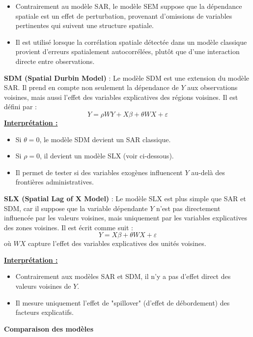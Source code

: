 \documentclass[
]{article}
\begin{document}
\begin{itemize}
\item Contrairement au modèle SAR, le modèle SEM suppose que la dépendance spatiale est un effet de perturbation, provenant d’omissions de variables pertinentes qui suivent une structure spatiale.
\item Il est utilisé lorsque la corrélation spatiale détectée dans un modèle classique provient d’erreurs spatialement autocorrélées, plutôt que d’une interaction directe entre observations.
\end{itemize}

\textbf{SDM (Spatial Durbin Model)} : Le modèle SDM est une extension du
modèle SAR. Il prend en compte non seulement la dépendance de \(Y\) aux
observations voisines, mais aussi l'effet des variables explicatives des
régions voisines. Il est défini par : \[
Y = \rho W Y + X \beta + \theta W X + \varepsilon
\] \underline{\textbf{Interprétation :}}

\begin{itemize}
\item Si \( \theta = 0 \), le modèle SDM devient un SAR classique.
\item Si \( \rho = 0 \), il devient un modèle SLX (voir ci-dessous).
\item Il permet de tester si des variables exogènes influencent \( Y \) au-delà des frontières administratives.
\end{itemize}

\textbf{SLX (Spatial Lag of X Model)} : Le modèle SLX est plus simple
que SAR et SDM, car il suppose que la variable dépendante \(Y\) n'est
pas directement influencée par les valeurs voisines, mais uniquement par
les variables explicatives des zones voisines. Il est écrit comme suit :
\[
Y = X \beta + \theta W X + \varepsilon
\] où \(W X\) capture l'effet des variables explicatives des unités
voisines.

\underline{\textbf{Interprétation :}}

\begin{itemize}
\item Contrairement aux modèles SAR et SDM, il n’y a pas d’effet direct des valeurs voisines de \( Y \).
\item Il mesure uniquement l'effet de "spillover" (d'effet de débordement) des facteurs explicatifs.
\end{itemize}

\textbf{Comparaison des modèles}
\end{document}
